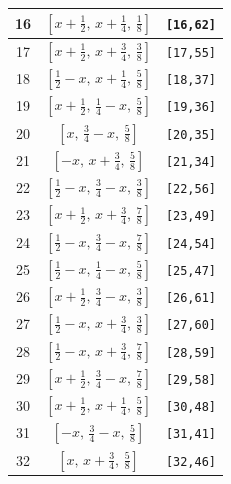 \documentclass[fleqn,8pt]{jsarticle}
\begin{document}
\begin{longtable}{ccc}
16 & $\left[ x + \frac{1}{2},\, x + \frac{1}{4},\, \frac{1}{8} \right]$ & {\tt [16,62]} \\ \hline
17 & $\left[ x + \frac{1}{2},\, x + \frac{3}{4},\, \frac{3}{8} \right]$ & {\tt [17,55]} \\ \hline
18 & $\left[ \frac{1}{2} - x,\, x + \frac{1}{4},\, \frac{5}{8} \right]$ & {\tt [18,37]} \\ \hline
19 & $\left[ x + \frac{1}{2},\, \frac{1}{4} - x,\, \frac{5}{8} \right]$ & {\tt [19,36]} \\ \hline
20 & $\left[ x,\, \frac{3}{4} - x,\, \frac{5}{8} \right]$ & {\tt [20,35]} \\ \hline
21 & $\left[ - x,\, x + \frac{3}{4},\, \frac{5}{8} \right]$ & {\tt [21,34]} \\ \hline
22 & $\left[ \frac{1}{2} - x,\, \frac{3}{4} - x,\, \frac{3}{8} \right]$ & {\tt [22,56]} \\ \hline
23 & $\left[ x + \frac{1}{2},\, x + \frac{3}{4},\, \frac{7}{8} \right]$ & {\tt [23,49]} \\ \hline
24 & $\left[ \frac{1}{2} - x,\, \frac{3}{4} - x,\, \frac{7}{8} \right]$ & {\tt [24,54]} \\ \hline
25 & $\left[ \frac{1}{2} - x,\, \frac{1}{4} - x,\, \frac{5}{8} \right]$ & {\tt [25,47]} \\ \hline
26 & $\left[ x + \frac{1}{2},\, \frac{3}{4} - x,\, \frac{3}{8} \right]$ & {\tt [26,61]} \\ \hline
27 & $\left[ \frac{1}{2} - x,\, x + \frac{3}{4},\, \frac{3}{8} \right]$ & {\tt [27,60]} \\ \hline
28 & $\left[ \frac{1}{2} - x,\, x + \frac{3}{4},\, \frac{7}{8} \right]$ & {\tt [28,59]} \\ \hline
29 & $\left[ x + \frac{1}{2},\, \frac{3}{4} - x,\, \frac{7}{8} \right]$ & {\tt [29,58]} \\ \hline
30 & $\left[ x + \frac{1}{2},\, x + \frac{1}{4},\, \frac{5}{8} \right]$ & {\tt [30,48]} \\ \hline
31 & $\left[ - x,\, \frac{3}{4} - x,\, \frac{5}{8} \right]$ & {\tt [31,41]} \\ \hline
32 & $\left[ x,\, x + \frac{3}{4},\, \frac{5}{8} \right]$ & {\tt [32,46]} \\
\end{longtable}
\renewcommand{\arraystretch}{1.2}
\end{document}
